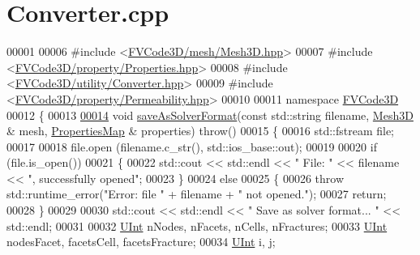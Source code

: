 \hypertarget{Converter_8cpp_source}{}\section{Converter.\+cpp}
\label{Converter_8cpp_source}

\begin{DoxyCode}
00001 
00006 \textcolor{preprocessor}{#include <\hyperlink{Mesh3D_8hpp}{FVCode3D/mesh/Mesh3D.hpp}>}
00007 \textcolor{preprocessor}{#include <\hyperlink{Properties_8hpp}{FVCode3D/property/Properties.hpp}>}
00008 \textcolor{preprocessor}{#include <\hyperlink{Converter_8hpp}{FVCode3D/utility/Converter.hpp}>}
00009 \textcolor{preprocessor}{#include <\hyperlink{Permeability_8hpp}{FVCode3D/property/Permeability.hpp}>}
00010 
00011 \textcolor{keyword}{namespace }\hyperlink{namespaceFVCode3D}{FVCode3D}
00012 \{
00013 
\hypertarget{Converter_8cpp_source.tex_l00014}{}\hyperlink{namespaceFVCode3D_ab3d72976b29466b3b389c290d0e8dadb}{00014} \textcolor{keywordtype}{void} \hyperlink{namespaceFVCode3D_ab3d72976b29466b3b389c290d0e8dadb}{saveAsSolverFormat}(\textcolor{keyword}{const} std::string filename, \hyperlink{classFVCode3D_1_1Mesh3D}{Mesh3D} & mesh, 
      \hyperlink{classFVCode3D_1_1PropertiesMap}{PropertiesMap} & properties) \textcolor{keywordflow}{throw}()
00015 \{
00016     std::fstream file;
00017 
00018     file.open (filename.c\_str(), std::ios\_base::out);
00019 
00020     \textcolor{keywordflow}{if} (file.is\_open())
00021     \{
00022         std::cout << std::endl << \textcolor{stringliteral}{" File: "} << filename << \textcolor{stringliteral}{", successfully opened"};
00023     \}
00024     \textcolor{keywordflow}{else}
00025     \{
00026         \textcolor{keywordflow}{throw} std::runtime\_error(\textcolor{stringliteral}{"Error: file "} + filename + \textcolor{stringliteral}{" not opened."});
00027         \textcolor{keywordflow}{return};
00028     \}
00029 
00030     std::cout << std::endl << \textcolor{stringliteral}{" Save as solver format... "} << std::endl;
00031 
00032     \hyperlink{namespaceFVCode3D_a4bf7e328c75d0fd504050d040ebe9eda}{UInt} nNodes, nFacets, nCells, nFractures;
00033     \hyperlink{namespaceFVCode3D_a4bf7e328c75d0fd504050d040ebe9eda}{UInt} nodesFacet, facetsCell, facetsFracture;
00034     \hyperlink{namespaceFVCode3D_a4bf7e328c75d0fd504050d040ebe9eda}{UInt} i, j;

\end{DoxyCode}
